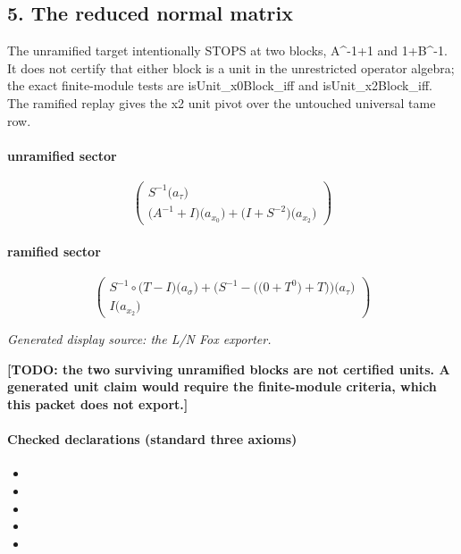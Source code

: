 \subsection*{5. The reduced normal matrix}
The unramified target intentionally STOPS at two blocks, A\textasciicircum{}-1+1 and 1+B\textasciicircum{}-1. It does not certify that either block is a unit in the unrestricted operator algebra; the exact finite-module tests are isUnit\_x0Block\_iff and isUnit\_x2Block\_iff. The ramified replay gives the x2 unit pivot over the untouched universal tame row.

\paragraph{unramified sector}
\[\begin{pmatrix}S^{-1}\bigl(a_{\tau}\bigr)\\\bigl(A^{-1}+I\bigr)\bigl(a_{x_{0}}\bigr)+\bigl(I+S^{-2}\bigr)\bigl(a_{x_{2}}\bigr)\end{pmatrix}\]
\paragraph{ramified sector}
\[\begin{pmatrix}S^{-1}\circ \bigl(T-I\bigr)\bigl(a_{\sigma}\bigr)+\bigl(S^{-1}-\bigl(\bigl(0+T^{0}\bigr)+T\bigr)\bigr)\bigl(a_{\tau}\bigr)\\I\bigl(a_{x_{2}}\bigr)\end{pmatrix}\]
\par\noindent\emph{Generated display source: the L/N Fox exporter.}
\par\noindent\textbf{[TODO: the two surviving unramified blocks are not certified units. A generated unit claim would require the finite-module criteria, which this packet does not export.]}
\paragraph{Checked declarations (standard three axioms)}
\begin{itemize}
\item {}
\item {}
\item {}
\item {}
\item {}
\end{itemize}

